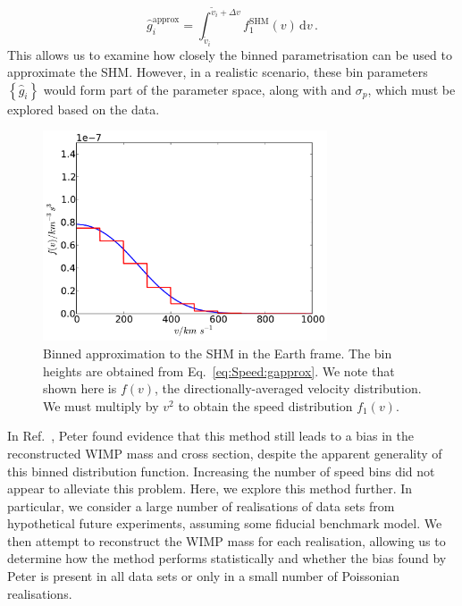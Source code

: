 \begin{equation}
\label{eq:Speed:gapprox}
\hat{g}_i^\textrm{approx} = \int_{\tilde{v}_i}^{\tilde{v}_i + \Delta v} f_1^{\textrm{SHM}}(v) \, \mathrm{d}v\,.
\end{equation}
This allows us to examine how closely the binned parametrisation can be used to approximate the SHM. However, in a realistic scenario, these bin parameters $\left\{\hat{g}_i\right\}$ would form part of the parameter space, along with \mchi and $\sigma_p$, which must be explored based on the data.

\begin{figure}[h]
\centering
  \includegraphics[width=0.75\textwidth]{Speed/BinnedApprox.pdf}
  \caption[Binned approximation to the SHM]{Binned approximation to the SHM in the Earth frame. The bin heights are obtained from Eq.~\ref{eq:Speed:gapprox}. We note that shown here is $f(v)$, the directionally-averaged velocity distribution. We must multiply by $v^2$ to obtain the speed distribution $f_1(v)$.}
  \label{fig:Speed:BinApprox}
\end{figure}

In Ref.~\cite{Peter:2011}, Peter found evidence that this method still leads to a bias in the reconstructed WIMP mass and cross section, despite the apparent generality of this binned distribution function. Increasing the number of speed bins did not appear to alleviate this problem. Here, we explore this method further. In particular, we consider a large number of realisations of data sets from hypothetical future experiments, assuming some fiducial benchmark model. We then attempt to reconstruct the WIMP mass for each realisation, allowing us to determine how the method performs statistically and whether the bias found by Peter is present in all data sets or only in a small number of Poissonian realisations.


